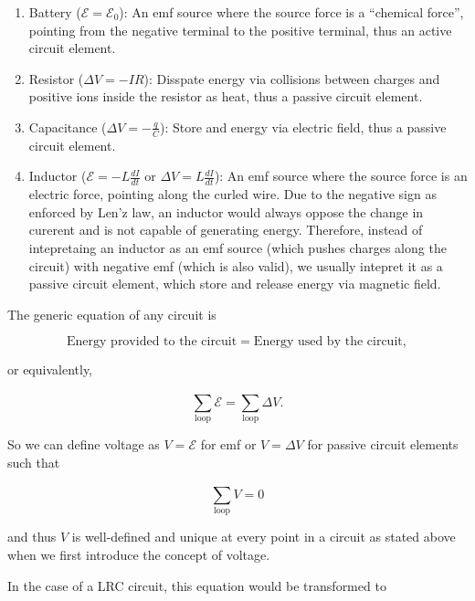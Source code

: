 \documentclass[english,a4paper,12pt]{report}
\begin{document}
\begin{enumerate}
    \item Battery (\(\mathcal{E} = \mathcal{E}_{0} \)): An emf source where the source force is a ``chemical force'', pointing from the negative terminal to the positive terminal, thus an active circuit element.
    \item Resistor (\(\Delta V = -IR\)): Disspate energy via collisions between charges and positive ions inside the resistor as heat, thus a passive circuit element.
    \item Capacitance (\(\Delta V = -\frac{q}{C} \)): Store and energy via electric field, thus a passive circuit element.
    \item Inductor (\(\mathcal{E} = -L\frac{dI}{dt} \text { or } \Delta V = L\frac{dI}{dt} \)): An emf source where the source force is an electric force, pointing along the curled wire. Due to the negative sign as enforced by Len'z law, an inductor would always oppose the change in curerent and is not capable of generating energy. Therefore, instead of intepretaing an inductor as an emf source (which pushes charges along the circuit) with negative emf (which is also valid), we usually intepret it as a passive circuit element, which store and release energy via magnetic field.   
\end{enumerate}

The generic equation of any circuit is 

\begin{equation}
    \text{Energy provided to the circuit} = \text{Energy used by the circuit},
\end{equation}

or equivalently, 

\begin{equation} \label{energycircuit} 
    \sum_{\text{loop} }^{} \mathcal{E} = \sum_{\text{loop} }^{} \Delta V. 
\end{equation}

So we can define voltage as \(V = \mathcal{E}\) for emf or \(V = \Delta V\) for passive circuit elements such that 

\begin{equation}
    \sum_{\text{loop} }^{} V = 0 
\end{equation}

and thus \(V\) is well-defined and unique at every point in a circuit as stated above when we first introduce the concept of voltage.



In the case of a LRC circuit, this equation would be transformed to 
\end{document}
